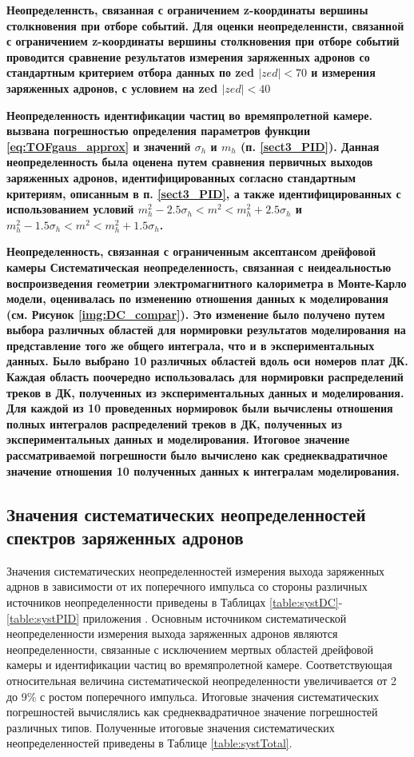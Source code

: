 \bfseries Неопределеннсть, связанная с ограничением z-координаты вершины столкновения при отборе событий. 
\mdseries
Для оценки неопределеннсти, связанной с ограничением z-координаты вершины столкновения при отборе событий проводится сравнение результатов измерения заряженных адронов со стандартным критерием отбора данных по zed $|zed|<70$ и измерения заряженных адронов, с условием на zed $|zed|<40$ 

\bfseries Неопределенность идентификации частиц во времяпролетной камере.
\mdseries
вызвана погрешностью определения параметров функции \ref{eq:TOFgaus_approx} и значений  $\sigma_h$ и $m_h$ (п. \ref{sect3_PID}). Данная неопределенность была оценена путем сравнения первичных выходов заряженных адронов, идентифицированных согласно стандартным критериям, описанным в п. \ref{sect3_PID}, а также идентифицированных с использованием условий $ m^2_h -2.5\sigma_h < m^2 < m^2_h +2.5\sigma_h $ и  $ m^2_h -1.5\sigma_h < m^2 < m^2_h +1.5\sigma_h $.

\bfseries Неопределенность, связанная с ограниченным аксептансом дрейфовой камеры
\mdseries
Систематическая неопределенность, связанная с неидеальностью воспроизведения геометрии электромагнитного калориметра в Монте-Карло модели, оценивалась по изменению отношения данных к моделирования (см.  Рисунок \ref{img:DC_compar}). Это изменение было получено путем выбора различных областей для нормировки результатов моделирования на представление того же общего интеграла, что и в экспериментальных данных. Было выбрано 10 различных областей вдоль оси номеров плат ДК. Каждая область поочередно использовалась для нормировки распределений треков в ДК, полученных из экспериментальных данных и моделирования. Для каждой из 10 проведенных нормировок были вычислены отношения полных интегралов распределений треков в ДК, полученных из экспериментальных данных и моделирования. Итоговое значение рассматриваемой погрешности было вычислено как среднеквадратичное значение отношения 10 полученных данных к интегралам моделирования. 

\subsection{Значения систематических неопределенностей спектров заряженных адронов} \label{sect3:SystValues}
Значения систематических неопределенностей измерения выхода заряженных адрнов в зависимости от их поперечного импульса со стороны различных источников неопределенности приведены в Таблицах \ref{table:systDC}-\ref{table:systPID} приложения \label{AppendixA}. Основным источником систематической неопределенности измерения выхода заряженных адронов являются неопределенности, связанные с исключением мертвых областей дрейфовой камеры и идентификации частиц во времяпролетной камере. Соответствующая относительная величина систематической неопределенности увеличивается от 2 до 9\% с ростом поперечного импульса. 
Итоговые значения систематических погрешностей вычислялись как среднеквадратичное значение погрешностей различных типов. Полученные итоговые значения систематических неопределенностей приведены в Таблице \ref{table:systTotal}.

